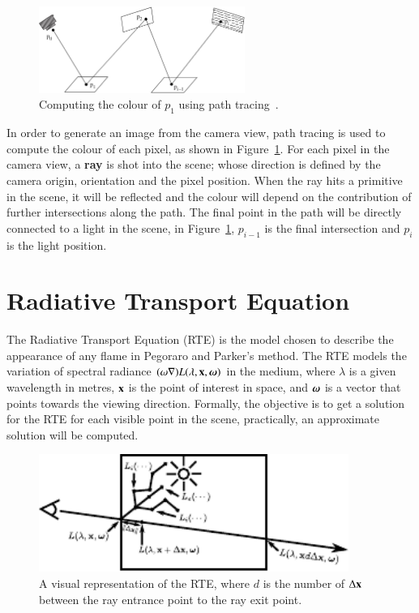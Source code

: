\begin{figure}[htbp!]
	\centering
	\includegraphics[width=0.6\textwidth]{img/path_tracing}
	\caption{Computing the colour of $p_1$ using path tracing~\cite{Pharr:2010}.}
	\label{fig:path_tracing}
\end{figure}

In order to generate an image from the camera view, path tracing is used to compute the colour of each pixel, as shown in Figure~\ref{fig:path_tracing}.
For each pixel in the camera view, a \textbf{ray} is shot into the scene; whose direction is defined by the camera origin, orientation and the pixel position.
When the ray hits a primitive in the scene, it will be reflected and the colour will depend on the contribution of further intersections along the path.
The final point in the path will be directly connected to a light in the scene, in Figure~\ref{fig:path_tracing}, $p_{i - 1}$ is the final intersection and $p_i$ is the light position.

\section{Radiative Transport Equation}
\label{sec:radiative_transport_equation}

The Radiative Transport Equation (RTE) \cite{Howell:2002} is the model chosen to describe the appearance of any flame in Pegoraro and Parker's method.
The RTE models the variation of spectral radiance $(\omega \nabla) L(\lambda, \mathbf{x}, \boldsymbol{\omega})$ in the medium, where $\lambda$ is a given wavelength in metres, $\mathbf{x}$ is the point of interest in space, and $\boldsymbol{\omega}$ is a vector that points towards the viewing direction.
Formally, the objective is to get a solution for the RTE for each visible point in the scene, practically, an approximate solution will be computed.

\begin{figure}[htbp!]
	\centering
	\includegraphics[width=0.9\textwidth]{img/ray_marching_parti}
	\caption{A visual representation of the RTE, where $d$ is the number of $\Delta \mathbf{x}$ between the ray entrance point to the ray exit point.}
	\label{fig:ray_marching_parti}
\end{figure}

